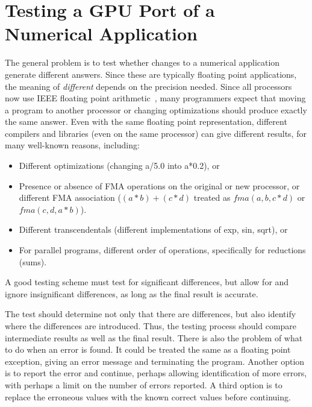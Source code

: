 \section{Testing a GPU Port of a Numerical Application}

The general problem is to test whether changes to a numerical application generate different answers.
Since these are typically floating point applications, the meaning of \emph{different} depends on the precision needed.
Since all processors now use IEEE floating point arithmetic~\cite{goldberg.cs.91}, many programmers expect that moving a program to another processor or changing optimizations should produce exactly the same answer.
Even with the same floating point representation, different compilers and libraries (even on the same processor) can give different results, for many well-known reasons, including:
\begin{itemize}
\item Different optimizations (changing a/5.0 into a*0.2), or
\item Presence or absence of FMA operations on the original or new processor, or different FMA association ($(a*b)+(c*d)$ treated as $\textit{fma}(a,b,c*d)$ or $\textit{fma}(c,d,a*b)$).
\item Different transcendentals (different implementations of exp, sin, sqrt), or
\item For parallel programs, different order of operations, specifically for reductions (sums).
\end{itemize}
A good testing scheme must test for significant differences, but allow for and ignore insignificant differences, as long as the final result is accurate.

The test should determine not only that there are differences, but also identify where the differences are introduced.
Thus, the testing process should compare intermediate results as well as the final result.
There is also the problem of what to do when an error is found.
It could be treated the same as a floating point exception, giving an error message and terminating the program.
Another option is to report the error and continue, perhaps allowing identification of more errors, with perhaps a limit on the number of errors reported.
A third option is to replace the erroneous values with the known correct values before continuing.


